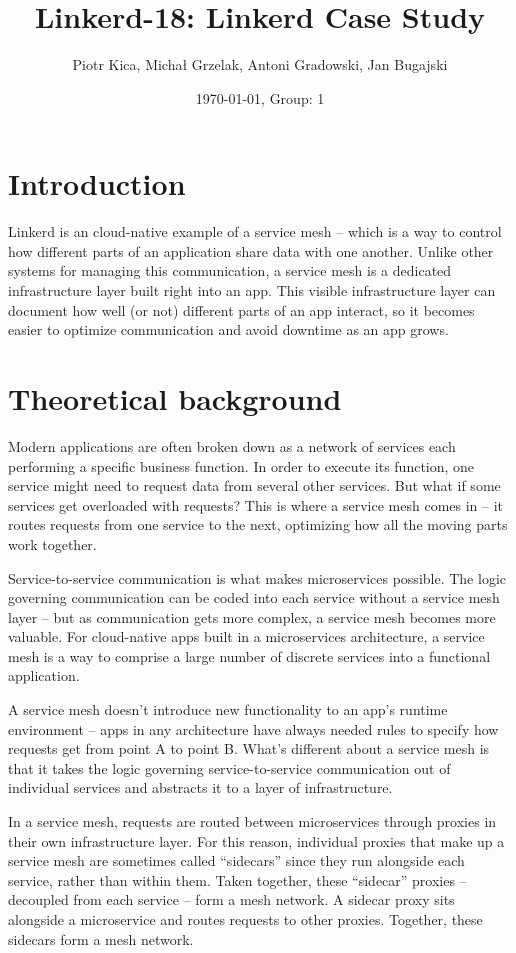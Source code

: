 \documentclass{article}
\author{Piotr Kica, Michał Grzelak, Antoni Gradowski, Jan Bugajski}
\title{Linkerd-18: Linkerd Case Study}
\date{\today, Group: 1}
\begin{document}
\maketitle
\tableofcontents

\section{Introduction}

Linkerd is an cloud-native example of a service mesh -- which is a way to
control how different parts of an application share data with one another.
Unlike other systems for managing this communication, a service mesh is a
dedicated infrastructure layer built right into an app. This visible
infrastructure layer can document how well (or not) different parts of an app
interact, so it becomes easier to optimize communication and avoid downtime as
an app grows. \cite{redhat:service-mesh}

\section{Theoretical background}

Modern applications are often broken down as a network of services each
performing a specific business function. In order to execute its function, one
service might need to request data from several other services. But what if
some services get overloaded with requests? This is where a service mesh comes
in -- it routes requests from one service to the next, optimizing how all the
moving parts work together.

Service-to-service communication is what makes microservices possible. The
logic governing communication can be coded into each service without a service
mesh layer -- but as communication gets more complex, a service mesh becomes
more valuable. For cloud-native apps built in a microservices architecture, a
service mesh is a way to comprise a large number of discrete services into a
functional application.

A service mesh doesn't introduce new functionality to an app's runtime
environment -- apps in any architecture have always needed rules to specify how
requests get from point A to point B. What's different about a service mesh is
that it takes the logic governing service-to-service communication out of
individual services and abstracts it to a layer of infrastructure.

In a service mesh, requests are routed between microservices through proxies in
their own infrastructure layer. For this reason, individual proxies that make
up a service mesh are sometimes called ``sidecars'' since they run alongside
each service, rather than within them. Taken together, these ``sidecar''
proxies -- decoupled from each service -- form a mesh network. A sidecar proxy
sits alongside a microservice and routes requests to other proxies. Together,
these sidecars form a mesh network.
\end{document}
